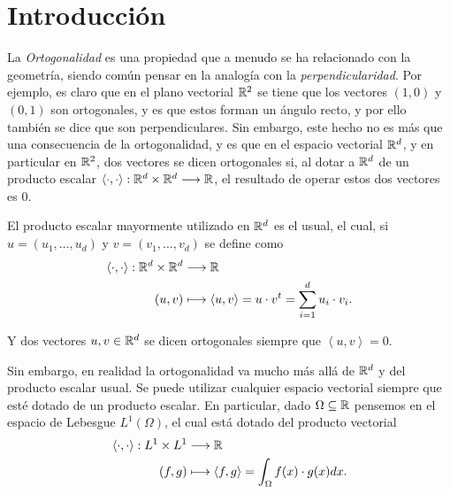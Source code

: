 

\section{Introducción}
\label{c1section:intro}

La \textit{Ortogonalidad} es una propiedad que a menudo se ha relacionado con la geometría, siendo común pensar en la analogía con la \textit{perpendicularidad}. Por ejemplo, es claro que en el plano vectorial $\mathbb{R}^2$ se tiene que los vectores $(1,0)$ y $(0,1)$ son ortogonales, y es que estos forman un ángulo recto, y por ello también se dice que son perpendiculares. Sin embargo, este hecho no es más que una consecuencia de la ortogonalidad, y es que en el espacio vectorial $\mathbb{R}^d$, y en particular en $\mathbb{R}^2$, dos vectores se dicen ortogonales si, al dotar a $\mathbb{R}^d$ de un producto escalar $\left\langle\cdot,\cdot\right\rangle:\mathbb{R}^d\times\mathbb{R}^d\longrightarrow \mathbb{R}$, el resultado de operar estos dos vectores es $0$.

El producto escalar mayormente utilizado en $\mathbb{R}^d$ es el usual, el cual, si $u=(u_1,\dots,u_d)$ y $v=(v_1,\dots,v_d)$ se define como
\begin{equation*}
    \begin{split}
        \left\langle\cdot,\cdot\right\rangle:\mathbb{R}^d\times\mathbb{R}^d &\longrightarrow \mathbb{R} \\
        (u,v)&\longmapsto \left\langle u, v \right\rangle=u\cdot v^t = \sum_{i=1}^d u_i\cdot v_i.
    \end{split}
\end{equation*}

Y dos vectores $u,v\in\mathbb{R}^d$ se dicen ortogonales siempre que $\left\langle u, v \right\rangle=0$.

Sin embargo, en realidad la ortogonalidad va mucho más allá de $\mathbb{R}^d$ y del producto escalar usual. Se puede utilizar cualquier espacio vectorial siempre que esté dotado de un producto escalar. En particular, dado $\Omega\subseteq \mathbb{R}$ pensemos en el espacio de Lebesgue $L^1(\Omega)$, el cual está dotado del producto vectorial
\begin{equation*}
    \begin{split}
        \left\langle\cdot,\cdot\right\rangle:L^1\times L^1 &\longrightarrow \mathbb{R} \\
        (f,g)&\longmapsto \left\langle f,g \right\rangle=\int_{\Omega}f(x)\cdot g(x)dx .
    \end{split}
\end{equation*}

